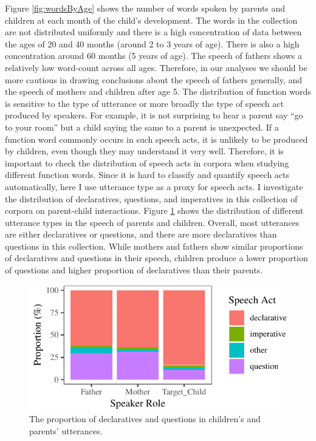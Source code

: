 \documentclass[floatsintext,man]{apa6}
\theoremstyle{definition}
\theoremstyle{definition}
\theoremstyle{definition}
\theoremstyle{remark}
\begin{document}
Figure \ref{fig:wordsByAge} shows the number of words spoken by parents
and children at each month of the child's development. The words in the
collection are not distributed uniformly and there is a high
concentration of data between the ages of 20 and 40 months (around 2 to
3 years of age). There is also a high concentration around 60 months (5
years of age). The speech of fathers shows a relatively low word-count
across all ages. Therefore, in our analyses we should be more cautious
in drawing conclusions about the speech of fathers generally, and the
speech of mothers and children after age 5. The distribution of function
words is sensitive to the type of utterance or more broadly the type of
speech act produced by speakers. For example, it is not surprising to
hear a parent say \enquote{go to your room} but a child saying the same
to a parent is unexpected. If a function word commonly occurs in such
speech acts, it is unlikely to be produced by children, even though they
may understand it very well. Therefore, it is important to check the
distribution of speech acts in corpora when studying different function
words. Since it is hard to classify and quantify speech acts
automatically, here I use utterance type as a proxy for speech acts. I
investigate the distribution of declaratives, questions, and imperatives
in this collection of corpora on parent-child interactions. Figure
\ref{fig:totalUtteranceTypePlot} shows the distribution of different
utterance types in the speech of parents and children. Overall, most
utterances are either declaratives or questions, and there are more
declaratives than questions in this collection. While mothers and
fathers show similar proportions of declaratives and questions in their
speech, children produce a lower proportion of questions and higher
proportion of declaratives than their parents.

\begin{figure}[tb]

{\centering \includegraphics{figs/totalUtteranceTypePlot-1} 

}

\caption{The proportion of declaratives and questions in children's and parents' utterances.}\label{fig:totalUtteranceTypePlot}
\end{figure}
\end{document}
